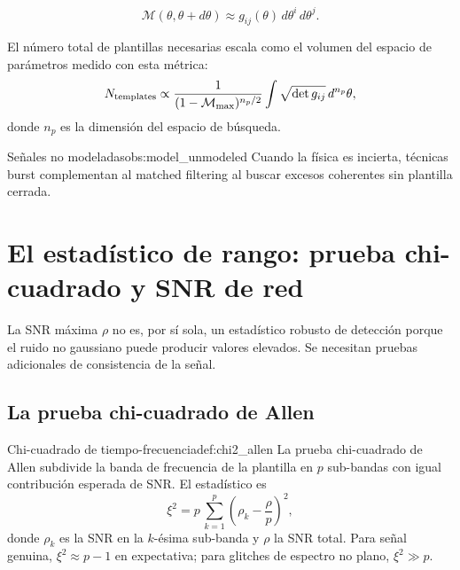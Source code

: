 \begin{equation}
  \mathcal{M}(\theta, \theta+d\theta) \approx g_{ij}(\theta)\,d\theta^i\,d\theta^j.
  \label{eq:metric_mismatch}
\end{equation}

El número total de plantillas necesarias escala como el volumen del espacio de parámetros medido con esta métrica:
\begin{equation}
  N_{\rm templates} \propto \frac{1}{(1-\mathcal{M}_{\rm max})^{n_p/2}}
  \int \sqrt{\det g_{ij}}\,d^{n_p}\theta,
\end{equation}
donde $n_p$ es la dimensión del espacio de búsqueda.

\begin{observacion}{Señales no modeladas}{obs:model_unmodeled}
Cuando la física es incierta, técnicas burst complementan al matched filtering al buscar excesos coherentes sin plantilla cerrada.
\end{observacion}

\section{El estadístico de rango: prueba chi-cuadrado y SNR de red}
\label{sec:estadistico_rango}

La SNR máxima $\rho$ no es, por sí sola, un estadístico robusto de detección porque el ruido no gaussiano puede producir valores elevados. Se necesitan pruebas adicionales de consistencia de la señal.

\subsection{La prueba chi-cuadrado de Allen}

\begin{definicion}{Chi-cuadrado de tiempo-frecuencia}{def:chi2_allen}
La prueba chi-cuadrado de Allen subdivide la banda de frecuencia de la plantilla en $p$ sub-bandas con igual contribución esperada de SNR. El estadístico es
\begin{equation}
  \xi^2 = p\,\sum_{k=1}^{p}\left(\rho_k - \frac{\rho}{p}\right)^2,
  \label{eq:chi2}
\end{equation}
donde $\rho_k$ es la SNR en la $k$-ésima sub-banda y $\rho$ la SNR total. Para señal genuina, $\xi^2\approx p-1$ en expectativa; para glitches de espectro no plano, $\xi^2\gg p$.
\end{definicion}

